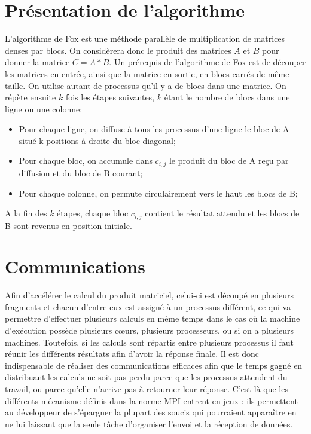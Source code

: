 \documentclass[a4paper,11pt]{article}
\begin{document}
\section{Présentation de l'algorithme}
L'algorithme de Fox est une méthode parallèle de multiplication de matrices denses par blocs. On considèrera donc le produit des matrices $A$ et $B$ pour donner la matrice $C=A*B$.
Un prérequis de l'algorithme de Fox est de découper les matrices en entrée, ainsi que la matrice en sortie, en blocs carrés de même taille. On utilise autant de processus qu'il y a de blocs dans une matrice.
On répète ensuite $k$ fois les étapes suivantes, $k$ étant le nombre de blocs dans une ligne ou une colonne:
\begin{itemize}
\item Pour chaque ligne, on diffuse à tous les processus d'une ligne le bloc de A situé k positions à droite du bloc diagonal;
\item Pour chaque bloc, on accumule dans $c_{i,j}$ le produit du bloc de A reçu par diffusion et du bloc de B courant;  
\item Pour chaque colonne, on permute circulairement vers le haut les blocs de B;
\end{itemize}

A la fin des $k$ étapes, chaque bloc $c_{i,j}$ contient le résultat attendu et les blocs de B sont revenus en position initiale.

\section{Communications}
Afin d'accélérer le calcul du produit matriciel, celui-ci est découpé en plusieurs fragments et chacun d'entre eux est assigné à un processus différent, ce qui va permettre d'effectuer plusieurs calculs en même temps dans le cas où la machine d'exécution possède plusieurs cœurs, plusieurs processeurs, ou si on a plusieurs machines. Toutefois, si les calculs sont répartis entre plusieurs processus il faut réunir les différents résultats afin d'avoir la réponse finale. Il est donc indispensable de réaliser des communications efficaces afin que le temps gagné en distribuant les calculs ne soit pas perdu parce que les processus attendent du travail, ou parce qu'elle n'arrive pas à retourner leur réponse. C'est là que les différents mécanisme définis dans la norme MPI entrent en jeux : ils permettent au développeur de s'épargner la plupart des soucis qui pourraient apparaître en ne lui laissant que la seule tâche d'organiser l'envoi et la réception de données.
\end{document}
